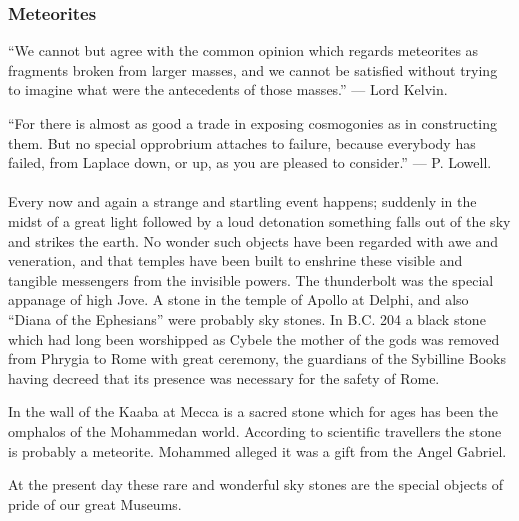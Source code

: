 \documentclass[a4paper, 12pt, oneside, landscape]{article}
\begin{document}
\subsubsection{Meteorites}
\begin{displayquote}
``We cannot but agree with the common opinion which regards meteorites as fragments broken from larger masses, and we cannot be satisfied without trying to imagine what were the antecedents of those masses.'' --- Lord Kelvin.
\end{displayquote}
\begin{displayquote}
``For there is almost as good a trade in exposing cosmogonies as in constructing them. But no special opprobrium attaches to failure, because everybody has failed, from Laplace down, or up, as you are pleased to consider.'' --- P. Lowell.
\end{displayquote}
\paragraph{}
Every now and again a strange and startling event happens; suddenly in the midst of a great light followed by a loud detonation something falls out of the sky and strikes the earth. No wonder such objects have been regarded with awe and veneration, and that temples have been built to enshrine these visible and tangible messengers from the invisible powers. The thunderbolt was the special appanage of high Jove. A stone in the temple of Apollo at Delphi, and also ``Diana of the Ephesians'' were probably sky stones. In B.C. 204 a black stone which had long been worshipped as Cybele the mother of the gods was removed from Phrygia to Rome with great ceremony, the guardians of the Sybilline Books having decreed that its presence was necessary for the safety of Rome.

In the wall of the Kaaba at Mecca is a sacred stone which for ages has been the omphalos of the Mohammedan world. According to scientific travellers the stone is probably a meteorite. Mohammed alleged it was a gift from the Angel Gabriel.

At the present day these rare and wonderful sky stones are the special objects of pride of our great Museums.
\end{document}
